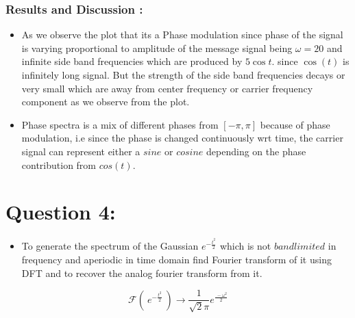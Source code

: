 \documentclass[11pt]{article}
\providecommand{\tightlist}{%
      \setlength{\itemsep}{0pt}\setlength{\parskip}{0pt}}
\begin{document}
	
		
    \subsubsection{Results and Discussion :}\label{results-and-discussion}

\begin{itemize}
\tightlist
\item
  As we observe the plot that its a Phase modulation since phase of the
  signal is varying proportional to amplitude of the message signal
  being \(\omega = 20\) and infinite side band frequencies which are
  produced by \(5\cos t\). since \(\cos(t)\) is infinitely long signal.
  But the strength of the side band frequencies decays or very small
  which are away from center frequency or carrier frequency component as
  we observe from the plot.
\item
  Phase spectra is a mix of different phases from \([-\pi,\pi]\) because
  of phase modulation, i.e since the phase is changed continuously wrt
  time, the carrier signal can represent either a \(sine\) or \(cosine\)
  depending on the phase contribution from \(cos(t)\).
\end{itemize}

	

	
		
    \section{Question 4:}\label{question-4}

\begin{itemize}
\tightlist
\item
  To generate the spectrum of the Gaussian \(e^{-\frac{t^{2}}{ 2}}\)
  which is not \(bandlimited\) in frequency and aperiodic in time domain
  find Fourier transform of it using DFT and to recover the analog
  fourier transform from it.
\end{itemize}

\begin{equation}
 \mathscr{F} ( \ e^{-\frac{t^{2}}{2}} \ ) \to \frac{1}{\sqrt 2\pi} e^{\frac{\ - \omega ^{2}}{2}}
\end{equation}
\end{document}
